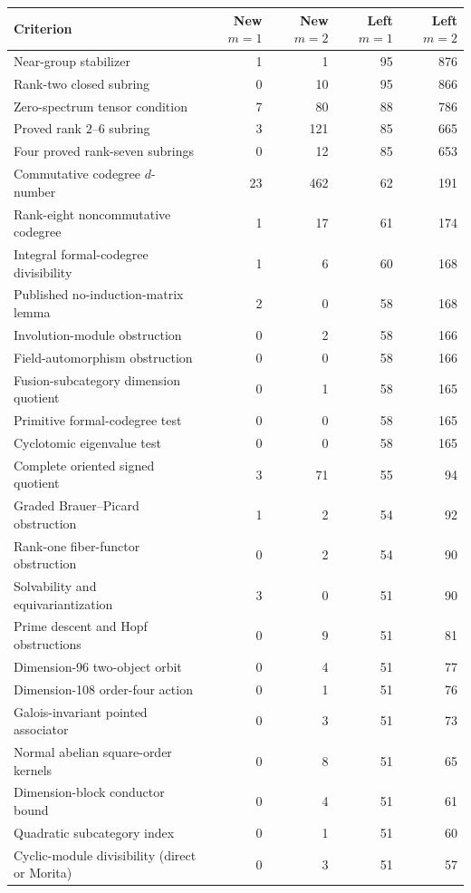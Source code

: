 \begin{tabular}{@{}lrrrr@{}}\toprule
Criterion & New $m=1$ & New $m=2$ & Left $m=1$ & Left $m=2$\\
\midrule
Near-group stabilizer & 1 & 1 & 95 & 876\\
Rank-two closed subring & 0 & 10 & 95 & 866\\
Zero-spectrum tensor condition & 7 & 80 & 88 & 786\\
Proved rank $2$--$6$ subring & 3 & 121 & 85 & 665\\
Four proved rank-seven subrings & 0 & 12 & 85 & 653\\
Commutative codegree $d$-number & 23 & 462 & 62 & 191\\
Rank-eight noncommutative codegree & 1 & 17 & 61 & 174\\
Integral formal-codegree divisibility & 1 & 6 & 60 & 168\\
Published no-induction-matrix lemma & 2 & 0 & 58 & 168\\
Involution-module obstruction & 0 & 2 & 58 & 166\\
Field-automorphism obstruction & 0 & 0 & 58 & 166\\
Fusion-subcategory dimension quotient & 0 & 1 & 58 & 165\\
Primitive formal-codegree test & 0 & 0 & 58 & 165\\
Cyclotomic eigenvalue test & 0 & 0 & 58 & 165\\
Complete oriented signed quotient & 3 & 71 & 55 & 94\\
Graded Brauer--Picard obstruction & 1 & 2 & 54 & 92\\
Rank-one fiber-functor obstruction & 0 & 2 & 54 & 90\\
Solvability and equivariantization & 3 & 0 & 51 & 90\\
Prime descent and Hopf obstructions & 0 & 9 & 51 & 81\\
Dimension-96 two-object orbit & 0 & 4 & 51 & 77\\
Dimension-108 order-four action & 0 & 1 & 51 & 76\\
Galois-invariant pointed associator & 0 & 3 & 51 & 73\\
Normal abelian square-order kernels & 0 & 8 & 51 & 65\\
Dimension-block conductor bound & 0 & 4 & 51 & 61\\
Quadratic subcategory index & 0 & 1 & 51 & 60\\
Cyclic-module divisibility (direct or Morita) & 0 & 3 & 51 & 57\\

\end{tabular}
